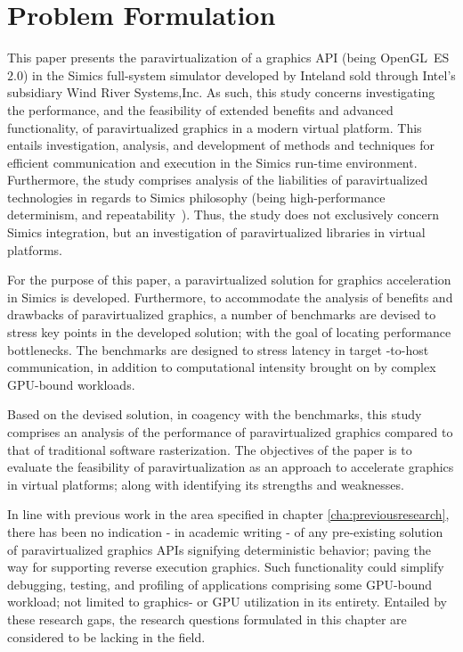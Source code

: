 
\section{Problem Formulation}
\label{sec:problemformulation}
This paper presents the paravirtualization of a graphics API (being OpenGL~ES~$2.0$) in the Simics full-system simulator developed by Intel\circledR and sold through Intel\circledR 's subsidiary Wind River Systems,Inc. 
As such, this study concerns investigating the performance, and the feasibility of extended benefits and advanced functionality, of paravirtualized graphics in a modern virtual platform.
This entails investigation, analysis, and development of methods and techniques for efficient communication and execution in the Simics run-time environment.
Furthermore, the study comprises analysis of the liabilities of paravirtualized technologies in regards to Simics philosophy (being high-performance determinism, and repeatability~).
Thus, the study does not exclusively concern Simics integration, but an investigation of paravirtualized libraries in virtual platforms.

For the purpose of this paper, a paravirtualized solution for graphics acceleration in Simics is developed.
Furthermore, to accommodate the analysis of benefits and drawbacks of paravirtualized graphics, a number of benchmarks are devised to stress key points in the developed solution; with the goal of locating performance bottlenecks.
The benchmarks are designed to stress latency in target -to-host communication, in addition to computational intensity brought on by complex GPU-bound workloads.

Based on the devised solution, in coagency with the benchmarks, this study comprises an analysis of the performance of paravirtualized graphics compared to that of traditional software rasterization.
The objectives of the paper is to evaluate the feasibility of paravirtualization as an approach to accelerate graphics in virtual platforms; along with identifying its strengths and weaknesses.

In line with previous work in the area specified in chapter \ref{cha:previousresearch}, there has been no indication - in academic writing - of any pre-existing solution of paravirtualized graphics APIs signifying deterministic behavior; paving the way for supporting reverse execution graphics.
Such functionality could simplify debugging, testing, and profiling of applications comprising some GPU-bound workload; not limited to graphics- or GPU utilization in its entirety.
Entailed by these research gaps, the research questions formulated in this chapter are considered to be lacking in the field.

